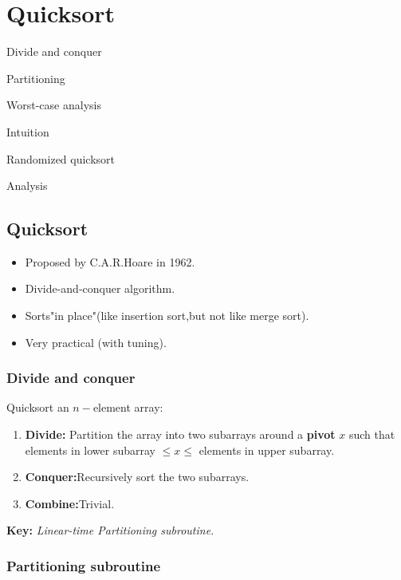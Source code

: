\documentclass[11pt,toc=twocol]{elegantbook}
\begin{document}
\chapter{Quicksort}

\begin{introduction}
\item Divide and conquer
\item Partitioning
\item Worst-case analysis
\item Intuition
\item Randomized quicksort
\item Analysis
\end{introduction}
\section{Quicksort}

\begin{note}
    \begin{itemize}
        \item Proposed by C.A.R.Hoare in 1962.
    
        \item Divide-and-conquer algorithm.
        
        \item Sorts"in place"(like insertion sort,but not like merge sort).
        
        \item Very practical (with tuning).
    \end{itemize}
\end{note}
\subsection{Divide and conquer}
Quicksort an $n-$element array:
\begin{enumerate}
    \item \textbf{Divide:} Partition the array into two subarrays around a \textbf{pivot} $x$ such that elements in lower subarray $\leq x \leq$ elements in upper subarray.
    \item \textbf{Conquer:}Recursively sort the two subarrays.
    \item \textbf{Combine:}Trivial.
\end{enumerate}
\begin{center}
    \textbf{Key:} \textit{Linear-time Partitioning subroutine.}
\end{center}
\subsection{Partitioning subroutine}\
\end{document}
